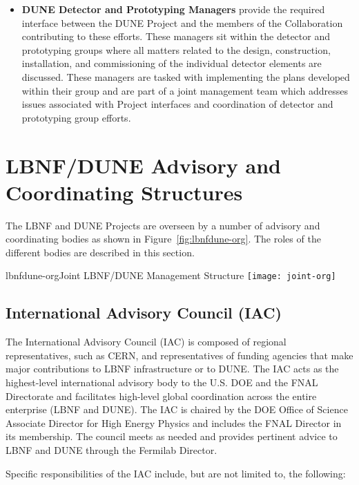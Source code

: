 \begin{itemize}
\item \textbf{DUNE Detector and Prototyping Managers} provide the required interface between the DUNE Project and the members of the Collaboration contributing to these efforts.  These managers sit within the detector and prototyping groups where all matters related to the design, construction, installation, and commissioning of the individual detector elements are discussed.  These managers are tasked with implementing the plans developed within their group and are part of a joint management team which addresses issues associated with Project interfaces and coordination of detector and prototyping group efforts.
\end{itemize}

\section{LBNF/DUNE Advisory and Coordinating Structures}
\label{sec:lbnf-dune-interface}


The LBNF and DUNE Projects are overseen by a number of advisory and
coordinating bodies as shown in Figure~\ref{fig:lbnfdune-org}.
The roles of the different bodies are described in this section.  

\begin{cdrfigure}{lbnfdune-org}{Joint LBNF/DUNE Management Structure}
  \texttt{[image: joint-org]}
\end{cdrfigure}


\subsection{International Advisory Council (IAC) }

The International Advisory Council (IAC) is composed of
regional representatives, such as CERN, and representatives of
funding agencies that make major contributions to LBNF infrastructure or to DUNE. The IAC 
acts as the highest-level international advisory body to the U.S.
DOE and the FNAL Directorate and facilitates
high-level global coordination across the entire enterprise (LBNF and DUNE).
The IAC is chaired by the DOE Office of Science Associate Director
for High Energy Physics and includes the FNAL Director in its membership.  
The council meets as needed and provides pertinent advice to %
LBNF and DUNE %
through the Fermilab Director.  


Specific responsibilities of the IAC include, but are not limited to,
the following:


